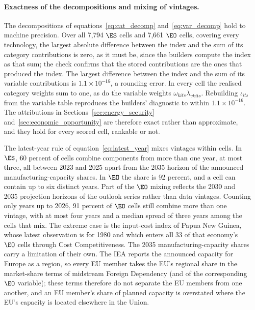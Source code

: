 \paragraph{Exactness of the decompositions and mixing of vintages.} The decompositions of
equations~\eqref{eq:cat_decomp} and~\eqref{eq:var_decomp} hold to machine precision. Over all
7,794 $\ES$ cells and 7,661 $\EO$ cells, covering every technology, the largest absolute
difference between the index and the sum of its category contributions is zero, as it must be,
since the builders compute the index as that sum; the check confirms that the stored
contributions are the ones that produced the index. The largest difference between the index
and the sum of its variable contributions is $1.1\times10^{-16}$, a rounding error. In every
cell the realised category weights sum to one, as do the variable weights
$\omega_{kits}\lambda_{vkits}$. Rebuilding $\iota_{its}$ from the variable table reproduces the
builders' diagnostic to within $1.1\times10^{-16}$. The attributions in
Sections~\ref{sec:energy_security} and~\ref{sec:economic_opportunity} are therefore exact rather
than approximate, and they hold for every scored cell, rankable or not.

The latest-year rule of equation~\eqref{eq:latest_year} mixes vintages within cells. In $\ES$,
60 percent of cells combine components from more than one year, at most three, all between 2023
and 2025 apart from the 2035 horizon of the announced manufacturing-capacity shares. In $\EO$ the
share is 92 percent, and a cell can contain up to six distinct years. Part of the $\EO$ mixing
reflects the 2030 and 2035 projection horizons of the outlook series rather than data vintages.
Counting only years up to 2026, 91 percent of $\EO$ cells still combine more than one vintage,
with at most four years and a median spread of three years among the cells that mix. The extreme
case is the input-cost index of Papua New Guinea, whose latest observation is for 1980 and which enters all 33 of that economy's $\EO$ cells through Cost Competitiveness.
The 2035 manufacturing-capacity shares carry a limitation of their own. The IEA reports the
announced capacity for Europe as a region, so every EU member takes the EU's regional share in the
market-share terms of midstream Foreign Dependency (and of the corresponding $\EO$ variable);
these terms therefore do not separate the EU members from one another, and an EU member's share
of planned capacity is overstated where the EU's capacity is located elsewhere in the Union.
